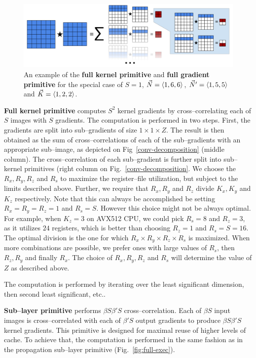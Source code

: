   \begin{figure}
     \centering
     \includegraphics[width=0.99\linewidth]{fig/update2}
     \caption{An example of the {\bf full kernel primitive} and {\bf
         full gradient primitive} for the special case of $S=1$,
       $\vec{N}=\langle1,6,6\rangle$, $\vec{N}' = \langle1,5,5\rangle$ and
       $\vec{K}=\langle1,2,2\rangle$.}
     \label{fig:conv-decomposition}
   \end{figure}

  {\bf Full kernel primitive} computes $S^2$ kernel gradients by
  cross--correlating each of $S$ images with $S$ gradients.  The
  computation is performed in two steps.  First, the gradients are
  split into sub--gradients of size $1 \times 1 \times Z$.  The result
  is then obtained as the sum of cross--correlations of each of the
  sub--gradients with an appropriate sub--image, as depicted on
  Fig~\ref{conv-decomposition} (middle column).  The
  cross--correlation of each sub--gradient is further split into
  sub--kernel primitives (right column on
  Fig.~\ref{conv-decomposition}.  We choose the $R_x, R_y, R_z$ and
  $R_s$ to maximize the register--file utilization, but subject to the
  limits described above.  Further, we require that $R_x, R_y$ and
  $R_z$ divide $K_x, K_y$ and $K_z$ respectively.  Note that this can
  always be accomplished be setting $R_x=R_y=R_z=1$ and $R_s=S$.
  However this choice might not be always optimal.  For example, when
  $K_z=3$ on AVX512 CPU, we could pick $R_s=8$ and $R_z=3$, as it
  utilizes $24$ registers, which is better than choosing $R_z=1$ and
  $R_s=S=16$.  The optimal division is the one for which $R_x \times
  R_y \times R_z \times R_s$ is maximized.  When more combinations are
  possible, we prefer ones with large values of $R_s$, then $R_z, R_y$
  and finally $R_x$.  The choice of $R_x, R_y, R_z$ and $R_s$ will
  determine the value of $Z$ as described above.

  The computation is performed by iterating over the least significant
  dimension, then second least significant, etc..

  {\bf Sub--layer primitive} performs $\beta S \beta' S$
  cross--correlation.  Each of $\beta S$ input images is
  cross--correlated with each of $\beta'S$ output gradients to produce
  $\beta S \beta' S$ kernel gradients.  This primitive is designed for
  maximal reuse of higher levels of cache.  To achieve that, the
  computation is performed in the same fashion as in the propagation
  sub--layer primitive (Fig.~\ref{fig:full-exec}).


